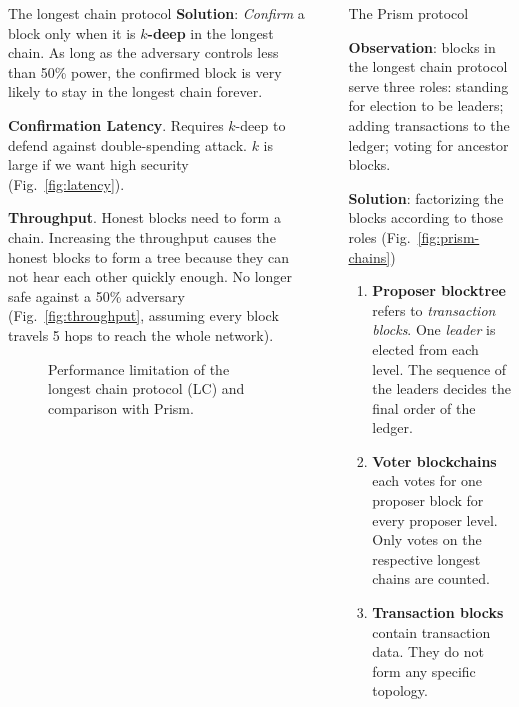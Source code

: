 \documentclass[final]{beamer}
\newlength{\sepwidth}
\newlength{\colwidth}
\newcommand{\separatorcolumn}{\begin{column}{\sepwidth}\end{column}}
\begin{document}
\begin{frame}[t]
\begin{columns}[t]
\begin{column}{\colwidth}
\begin{block}{The longest chain protocol}
  \textbf{Solution}: \textit{Confirm} a block only when it is \textbf{$k$-deep} in the longest chain. As long as the adversary controls less than 50\% power, the confirmed block is very likely to stay in the longest chain forever. 
  
    
  \textbf{Confirmation Latency}. Requires $k$-deep to defend against double-spending attack. $k$ is large if we want high security (Fig.~\ref{fig:latency}).
  
  \textbf{Throughput}. Honest blocks need to form a chain. Increasing the throughput causes the honest blocks to form a tree because they can not hear each other quickly enough. No longer safe against a 50\% adversary (Fig.~\ref{fig:throughput}, assuming every block travels 5 hops to reach the whole network).
  
  \begin{figure}
      \centering
      \caption{Performance limitation of the longest chain protocol (LC) and comparison with Prism.}
  \end{figure}
  \end{block}
  
\end{column}

\separatorcolumn

\begin{column}{\colwidth}

  
  \begin{alertblock}{The Prism protocol}

  \textbf{Observation}: blocks in the longest chain protocol serve three roles: standing for election to be leaders; adding transactions to the ledger; voting for ancestor blocks.
  
  \textbf{Solution}: factorizing the blocks according to those roles (Fig.~\ref{fig:prism-chains})
  
  \begin{enumerate}
      \item \textbf{Proposer blocktree} refers to \textit{transaction blocks}. One \textit{leader} is elected from each level. The sequence of the leaders decides the final order of the ledger.
      \item \textbf{Voter blockchains} each votes for one proposer block for every proposer level. Only votes on the respective longest chains are counted.  
      \item \textbf{Transaction blocks} contain transaction data. They do not form any specific topology.
  \end{enumerate}
    

\end{alertblock}
\end{column}
\end{columns}
\end{frame}
\end{document}
